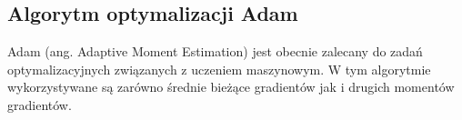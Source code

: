 \newpage
\subsection{Algorytm optymalizacji Adam}
Adam (ang. Adaptive Moment Estimation) jest obecnie zalecany do zadań optymalizacyjnych związanych z uczeniem maszynowym.
W tym algorytmie wykorzystywane są zarówno średnie bieżące gradientów jak i drugich momentów gradientów.
